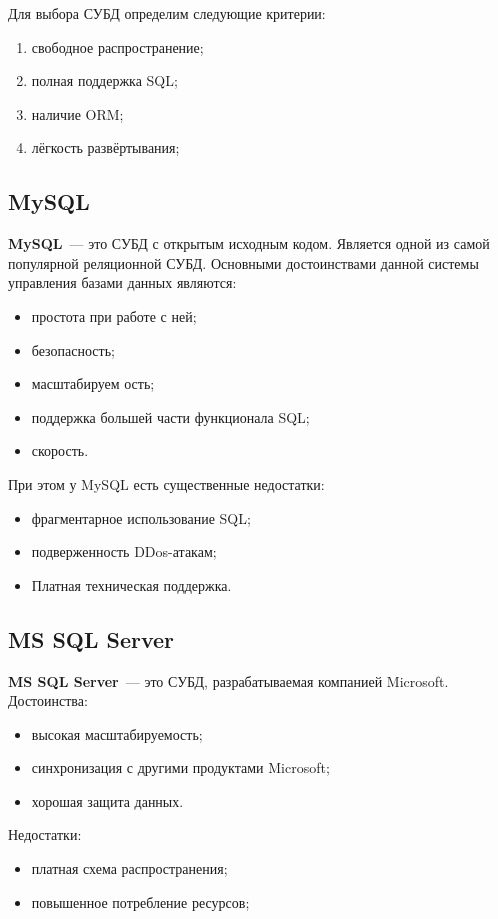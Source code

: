 Для выбора СУБД определим следующие критерии:
\begin{enumerate}
    \item свободное распространение;
    \item полная поддержка SQL;
    \item наличие ORM;
    \item лёгкость развёртывания;
\end{enumerate}

\subsection{MySQL}%
\label{sub:mysql}

\textbf{MySQL}~--- это СУБД с открытым исходным кодом. Является одной из самой популярной реляционной СУБД. Основными достоинствами данной системы управления базами данных являются:
\begin{itemize}
    \item простота при работе с ней;
    \item безопасность;
    \item масштабируем ость;
    \item поддержка большей части функционала SQL;
    \item скорость.
\end{itemize}
При этом у MySQL есть существенные недостатки:
\begin{itemize}
    \item фрагментарное использование SQL;
    \item подверженность DDos-атакам;
    \item Платная техническая поддержка.
\end{itemize}

\subsection{MS SQL Server}%
\label{sub:ms_sql_server}

\textbf{MS SQL Server}~--- это СУБД, разрабатываемая компанией Microsoft. Достоинства:
\begin{itemize}
    \item высокая масштабируемость;
    \item синхронизация с другими продуктами Microsoft;
    \item хорошая защита данных.
\end{itemize}

Недостатки:
\begin{itemize}
    \item платная схема распространения;
    \item повышенное потребление ресурсов;
\end{itemize}

